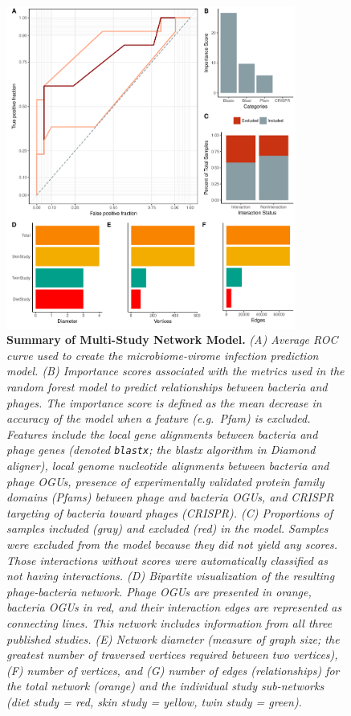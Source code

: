 \documentclass[12pt,]{article}
\begin{document}
\begin{figure}[htbp]
\centering
\includegraphics[width=0.85000\textwidth]{../figures/rocCurves.pdf}
\caption{\textbf{Summary of Multi-Study Network Model.} \emph{(A)
Average ROC curve used to create the microbiome-virome infection
prediction model. (B) Importance scores associated with the metrics used
in the random forest model to predict relationships between bacteria and
phages. The importance score is defined as the mean decrease in accuracy
of the model when a feature (e.g.~Pfam) is excluded. Features include
the local gene alignments between bacteria and phage genes (denoted
\texttt{blastx}; the blastx algorithm in Diamond aligner), local genome
nucleotide alignments between bacteria and phage OGUs, presence of
experimentally validated protein family domains (Pfams) between phage
and bacteria OGUs, and CRISPR targeting of bacteria toward phages
(CRISPR). (C) Proportions of samples included (gray) and excluded (red)
in the model. Samples were excluded from the model because they did not
yield any scores. Those interactions without scores were automatically
classified as not having interactions. (D) Bipartite visualization of
the resulting phage-bacteria network. Phage OGUs are presented in
orange, bacteria OGUs in red, and their interaction edges are
represented as connecting lines. This network includes information from
all three published studies. (E) Network diameter (measure of graph
size; the greatest number of traversed vertices required between two
vertices), (F) number of vertices, and (G) number of edges
(relationships) for the total network (orange) and the individual study
sub-networks (diet study = red, skin study = yellow, twin study =
green).} \label{RocCurve}}
\end{figure}
\end{document}
